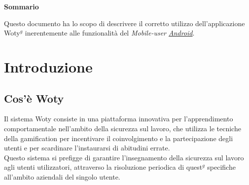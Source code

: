 

\newpage

\vspace*{0.5cm} %
\begin{center}

\textbf{{\huge{Sommario}}}

\vspace*{0.2cm} %

Questo documento ha lo scopo di descrivere il corretto utilizzo dell'applicazione Woty$^g$ inerentemente alle funzionalità del \textit{Mobile-user \underline{Android}}.

\end{center}







\newpage
\tableofcontents %

\let\cleardoublepage\clearpage %






\newpage
\section{Introduzione}
	\subsection{Cos'è Woty}
Il sistema Woty consiste in una piattaforma innovativa per l'apprendimento comportamentale nell'ambito della sicurezza sul lavoro, che utilizza le tecniche della gamification per incentivare il coinvolgimento e la partecipazione degli utenti e per scardinare l'instaurarsi di abitudini errate.\\
Questo sistema si prefigge di garantire l'insegnamento della sicurezza sul lavoro agli utenti utilizzatori, attraverso la risoluzione periodica di quest$^g$ specifiche all'ambito aziendali del singolo utente.
	
